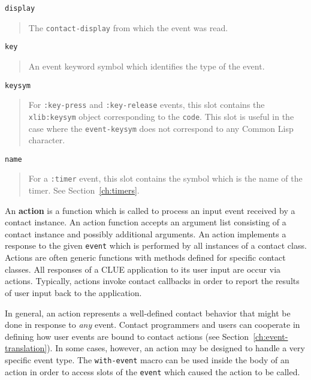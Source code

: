 \documentclass[twoside]{book}
\begin{document}
\begin{sloppy}
\begin{flushright}
{}\end{flushright}
\begin{flushright} \parbox[t]{6.125in}{
{\tt display}
\begin{quote}
The {\tt contact-display} from which the event was read.
\end{quote}

}\end{flushright}
\begin{flushright} \parbox[t]{6.125in}{
{\tt key}
\begin{quote}
An event keyword symbol which identifies the type of the event.
\end{quote}

}\end{flushright}
\begin{flushright} \parbox[t]{6.125in}{
{\tt keysym}
\begin{quote}
For {\tt :key-press} and {\tt :key-release} events, this slot contains the {\tt
xlib:keysym}
object corresponding to the {\tt code}. This slot is useful in the case where
the {\tt event-keysym} does not correspond to any Common Lisp character.
\end{quote}

}\end{flushright}
\begin{flushright} \parbox[t]{6.125in}{
{\tt name}
\begin{quote}
For a {\tt :timer} event, this slot contains the symbol which is the name of the
timer. See Section~\ref{ch:timers}.
\end{quote}

}\end{flushright}



An {\bf action} is a function which is called to
process an input event received by a contact instance. An action function
accepts an argument list consisting of a contact instance and possibly
additional arguments.
An action implements a response to
the given {\tt event} which is performed by all instances of a contact class.
Actions are often generic functions with methods defined for
specific contact classes.
All responses of a CLUE application to its user input are occur via
actions. Typically, actions invoke contact callbacks in
order to report the results of user input back to the application.

In general, an action represents a well-defined contact behavior that
might be done in response to {\em any} event. Contact programmers and
users can cooperate in defining how user events are bound to contact
actions (see Section~\ref{ch:event-translation}). In some cases,
however, an action may be designed to handle a very specific event type.
The {\tt with-event} macro can be used inside the body of an action in
order to access slots of the {\tt event} which caused the action to be
called.


\end{sloppy}
\end{document}
